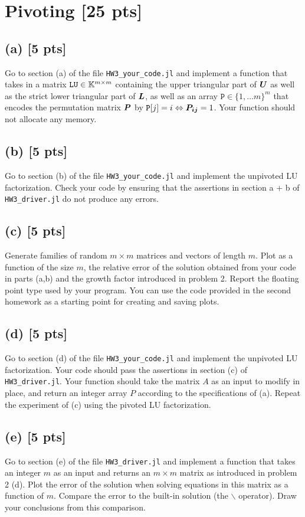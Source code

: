 \documentclass[twoside,10pt]{article}
\begin{document}
\section{Pivoting [25 pts]}
\subsection*{(a) [5 pts]} 
Go to section (a) of the file \texttt{HW3\_your\_code.jl} and implement a function that takes in a matrix $\mathtt{LU} \in \mathbb{K}^{m \times m}$ containing the upper triangular part of $\bm{U}$ as well as the strict lower triangular part of $\bm{L}$, as well as an array $\mathtt{P} \in \{1, \ldots m\}^{m}$ that encodes the permutation matrix $\bm{P}$ by $\mathtt{P}[j] = i \Leftrightarrow \bm{P_{ij}} = 1$.
Your function should not allocate any memory. 


\subsection*{(b) [5 pts]} 
Go to section (b) of the file \texttt{HW3\_your\_code.jl} and implement the unpivoted LU factorization. 
Check your code by ensuring that the assertions in section a + b of \texttt{HW3\_driver.jl} do not produce any errors.

\subsection*{(c) [5 pts]}
Generate families of random $m \times m$ matrices and vectors of length $m$. 
Plot as a function of the size $m$, the relative error of the solution obtained from your code in parts (a,b) and the growth factor introduced in problem 2.
Report the floating point type used by your program.
You can use the code provided in the second homework as a starting point for creating and saving plots.

\subsection*{(d) [5 pts]}
Go to section (d) of the file \texttt{HW3\_your\_code.jl} and implement the unpivoted LU factorization. 
Your code should pass the assertions in section (c) of \texttt{HW3\_driver.jl}.
Your function should take the matrix $A$ as an input to modify in place, and return an integer array $P$ according to the specifications of (a).
Repeat the experiment of (c) using the pivoted LU factorization. 


\subsection*{(e) [5 pts]}
Go to section (e) of the file \texttt{HW3\_driver.jl} and implement a function that takes an integer $m$ as an input and returns an $m \times m$ matrix as introduced in problem 2 (d).
Plot the error of the solution when solving equations in this matrix as a function of $m$. 
Compare the error to the built-in solution (the $\backslash$ operator). 
Draw your conclusions from this comparison. 


\end{document}
